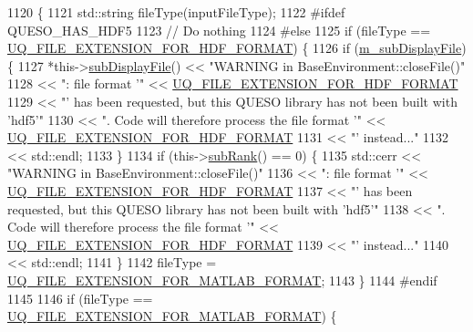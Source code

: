 \begin{DoxyCode}
1120 \{
1121   std::string fileType(inputFileType);
1122 \textcolor{preprocessor}{#ifdef QUESO\_HAS\_HDF5}
1123 \textcolor{preprocessor}{}  \textcolor{comment}{// Do nothing}
1124 \textcolor{preprocessor}{#else}
1125 \textcolor{preprocessor}{}  \textcolor{keywordflow}{if} (fileType == \hyperlink{_defines_8h_a4ebcc075277d031eb97c90b9a45f4493}{UQ\_FILE\_EXTENSION\_FOR\_HDF\_FORMAT}) \{
1126     \textcolor{keywordflow}{if} (\hyperlink{class_q_u_e_s_o_1_1_base_environment_a52b4275aa8ee85994dd304d9fe95c9c5}{m\_subDisplayFile}) \{
1127       *this->\hyperlink{class_q_u_e_s_o_1_1_base_environment_a8a0064746ae8dddfece4229b9ad374d6}{subDisplayFile}() << \textcolor{stringliteral}{"WARNING in BaseEnvironment::closeFile()"}
1128                               << \textcolor{stringliteral}{": file format '"} << 
      \hyperlink{_defines_8h_a4ebcc075277d031eb97c90b9a45f4493}{UQ\_FILE\_EXTENSION\_FOR\_HDF\_FORMAT}
1129                               << \textcolor{stringliteral}{"' has been requested, but this QUESO library has not been built with
       'hdf5'"}
1130                               << \textcolor{stringliteral}{". Code will therefore process the file format '"} << 
      \hyperlink{_defines_8h_a4ebcc075277d031eb97c90b9a45f4493}{UQ\_FILE\_EXTENSION\_FOR\_HDF\_FORMAT}
1131                               << \textcolor{stringliteral}{"' instead..."}
1132                               << std::endl;
1133     \}
1134     \textcolor{keywordflow}{if} (this->\hyperlink{class_q_u_e_s_o_1_1_base_environment_a172d52f993f1322ed45aaddf71518dbb}{subRank}() == 0) \{
1135       std::cerr << \textcolor{stringliteral}{"WARNING in BaseEnvironment::closeFile()"}
1136                 << \textcolor{stringliteral}{": file format '"} << \hyperlink{_defines_8h_a4ebcc075277d031eb97c90b9a45f4493}{UQ\_FILE\_EXTENSION\_FOR\_HDF\_FORMAT}
1137                 << \textcolor{stringliteral}{"' has been requested, but this QUESO library has not been built with 'hdf5'"}
1138                 << \textcolor{stringliteral}{". Code will therefore process the file format '"} << 
      \hyperlink{_defines_8h_a4ebcc075277d031eb97c90b9a45f4493}{UQ\_FILE\_EXTENSION\_FOR\_HDF\_FORMAT}
1139                 << \textcolor{stringliteral}{"' instead..."}
1140                 << std::endl;
1141     \}
1142     fileType = \hyperlink{_defines_8h_ac440026eff7deb1c1eed1eea0e8e36ba}{UQ\_FILE\_EXTENSION\_FOR\_MATLAB\_FORMAT};
1143   \}
1144 \textcolor{preprocessor}{#endif}
1145 \textcolor{preprocessor}{}
1146   \textcolor{keywordflow}{if} (fileType == \hyperlink{_defines_8h_ac440026eff7deb1c1eed1eea0e8e36ba}{UQ\_FILE\_EXTENSION\_FOR\_MATLAB\_FORMAT}) \{

\end{DoxyCode}
